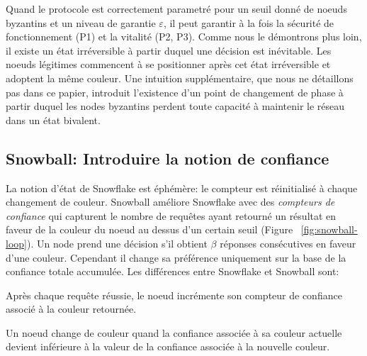 \documentclass[letterpaper,twocolumn,10pt]{article}
\theoremstyle{definition}
\begin{document}
Quand le protocole est correctement parametré pour un seuil donné de noeuds byzantins et un niveau de garantie
$\varepsilon$, il peut garantir à la fois la sécurité de fonctionnement (P1) et la vitalité (P2, P3).
Comme nous le démontrons plus loin, il existe un état irréversible à partir duquel une décision est inévitable. Les noeuds
légitimes commencent à se positionner après cet état irréversible et adoptent la même couleur. Une intuition
supplémentaire, que nous ne détaillons pas dans ce papier, introduit l'existence d'un point de changement de phase à
partir duquel les nodes byzantins perdent toute capacité à maintenir le réseau dans un état bivalent.



\subsection{Snowball: Introduire la notion de confiance}

La notion d'état de Snowflake est éphémère: le compteur est réinitialisé à chaque changement de couleur.
Snowball améliore Snowflake avec des \emph{compteurs de confiance} qui capturent le nombre de requêtes ayant retourné
un résultat en faveur de la couleur du noeud au dessus d'un certain seuil (Figure ~\ref{fig:snowball-loop}).
Un node prend une décision s'il obtient $\beta$ réponses consécutives en faveur d'une couleur. Cependant il change
sa préférence uniquement sur la base de la confiance totale accumulée. Les différences entre Snowflake et Snowball
sont:

\begin{compactenum}
    \item Après chaque requête réussie, le noeud incrémente son compteur de confiance associé à la couleur retournée.
    \item Un noeud change de couleur quand la confiance associée à sa couleur actuelle devient inférieure à la
      valeur de la confiance associée à  la nouvelle couleur.
\end{compactenum}
\end{document}
